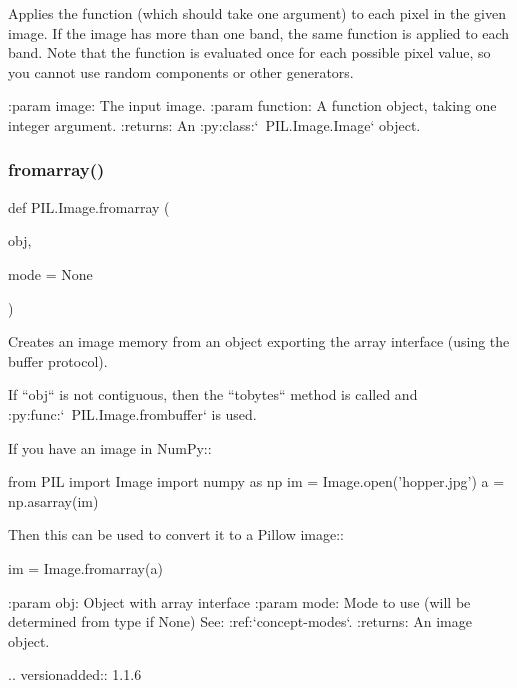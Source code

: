 \begin{DoxyVerb}Applies the function (which should take one argument) to each pixel
in the given image. If the image has more than one band, the same
function is applied to each band. Note that the function is
evaluated once for each possible pixel value, so you cannot use
random components or other generators.

:param image: The input image.
:param function: A function object, taking one integer argument.
:returns: An :py:class:`~PIL.Image.Image` object.
\end{DoxyVerb}
 \mbox{\label{namespacePIL_1_1Image_aeea8260fec1727a6571f301837ee59f7}} 
\subsubsection{\texorpdfstring{fromarray()}{fromarray()}}
{\footnotesize\ttfamily def P\+I\+L.\+Image.\+fromarray (\begin{DoxyParamCaption}\item[{}]{obj,  }\item[{}]{mode = {\ttfamily None} }\end{DoxyParamCaption})}

\begin{DoxyVerb}Creates an image memory from an object exporting the array interface
(using the buffer protocol).

If ``obj`` is not contiguous, then the ``tobytes`` method is called
and :py:func:`~PIL.Image.frombuffer` is used.

If you have an image in NumPy::

  from PIL import Image
  import numpy as np
  im = Image.open('hopper.jpg')
  a = np.asarray(im)

Then this can be used to convert it to a Pillow image::

  im = Image.fromarray(a)

:param obj: Object with array interface
:param mode: Mode to use (will be determined from type if None)
  See: :ref:`concept-modes`.
:returns: An image object.

.. versionadded:: 1.1.6
\end{DoxyVerb}
 \mbox{\label{namespacePIL_1_1Image_addf457b4a5c943977ab666c2356ff755}} 

